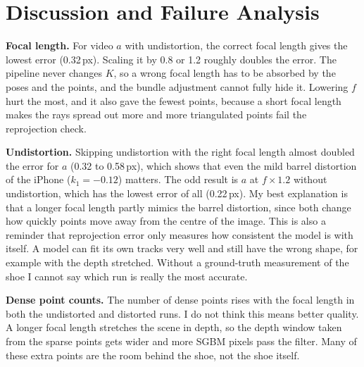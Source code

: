 \documentclass[conference]{assets/latex/IEEEtran}
\begin{document}
\section{Discussion and Failure Analysis}

\textbf{Focal length.} For video $a$ with undistortion, the correct focal length gives
the lowest error (0.32\,px). Scaling it by 0.8 or 1.2 roughly doubles the error. The pipeline
never changes $K$, so a wrong focal length has to be absorbed by the poses and the points, and
the bundle adjustment cannot fully hide it. Lowering $f$ hurt the most, and it also gave the
fewest points, because a short focal length makes the rays spread out more and more triangulated
points fail the reprojection check.

\textbf{Undistortion.} Skipping undistortion with the right focal length almost doubled the
error for $a$ (0.32 to 0.58\,px), which shows that even the mild barrel distortion of the iPhone
($k_1=-0.12$) matters. The odd result is $a$ at $f\times1.2$ without undistortion, which has the
lowest error of all (0.22\,px). My best explanation is that a longer focal length partly mimics
the barrel distortion, since both change how quickly points move away from the centre of the
image. This is also a reminder that reprojection error only measures how consistent the model is
with itself. A model can fit its own tracks very well and still have the wrong shape, for example
with the depth stretched. Without a ground-truth measurement of the shoe I cannot say which run
is really the most accurate.

\textbf{Dense point counts.} The number of dense points rises with the focal length in both the
undistorted and distorted runs. I do not think this means better quality. A longer focal length
stretches the scene in depth, so the depth window taken from the sparse points gets wider and
more SGBM pixels pass the filter. Many of these extra points are the room behind the shoe, not
the shoe itself.
\end{document}
